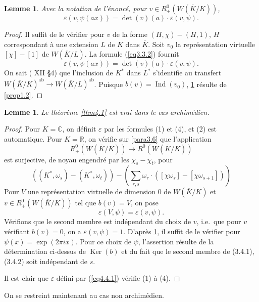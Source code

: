 \documentclass[11pt,a4paper]{amsart}
\theoremstyle{plain}
\newtheorem{lemma}[theorem]{Lemme}
\theoremstyle{definition}
\DeclareMathOperator{\Ind}{Ind}
\DeclareMathOperator{\Ker}{Ker}
\newcommand{\dbR}{\mathbb{R}}
\newcommand{\dbC}{\mathbb{C}}
\newcommand{\ab}{\mathrm{ab}}
\newcommand{\ov}[1]{\overline{#1}}
\newcommand{\eps}{\varepsilon}
\begin{document}
\begin{lemma}\label{lem4.3}
Avec la notation de l'\'enonc\'e, pour $v \in R_{+}^{0}(W(\ov{K}/K))$,
\[
\eps(v,\psi(ax)) = \det(v)(a) \cdot \eps(v,\psi).
\]
\end{lemma}

\begin{proof}
Il suffit de le v\'erifier pour $v$ de la forme $(H,\chi) - (H,1)$, $H$ correspondant \`a une extension $L$ de $K$ dans $\ov{K}$. Soit $v_{0}$ la repr\'esentation virtuelle $[\chi] - [1]$ de $W(\ov{K}/L)$. La formule (\ref{eq3.3.2}) fournit
\[
\eps(v,\psi(ax)) = \det(v)(a) \cdot \eps(v,\psi).
\]
On sait (\cite{10} XII \S4) que l'inclusion de $K^{*}$ dans $L^{*}$ s'identifie au transfert $W(\ov{K}/K)^{\ab} \to W(\ov{K}/L)^{\ab}$. Puisque $b(v) = \Ind(v_{0})$, \ref{lem4.3} r\'esulte de \ref{prop1.2}.
\end{proof}

\begin{lemma}\label{lem4.4}
Le th\'eor\`eme \ref{thm4.1} est vrai dans le cas archim\'edien.
\end{lemma}

\begin{proof}
Pour $K = \dbC$, on d\'efinit $\eps$ par les formules (1) et (4), et (2) est automatique. Pour $K = \dbR$, on v\'erifie sur \ref{para3.6} que l'application
\[
R_{+}^{0}(W(\ov{K}/K)) \longrightarrow R^{0}(W(\ov{K}/K))
\]
est surjective, de noyau engendr\'e par les $\chi_{s} - \chi_{t}$, pour
\[
((K^{*},\omega_{s}) - (K^{*},\omega_{t})) - (\sum_{r,s} \omega_{r} \cdot ([\chi\omega_{s}] - [\chi\omega_{s+1}]))
\]
Pour $V$ une repr\'esentation virtuelle de dimension $0$ de $W(\ov{K}/K)$ et $v \in R_{+}^{0}(W(\ov{K}/K))$ tel que $b(v) = V$, on pose
\begin{equation}\label{eq4.4.1}
\eps(V,\psi) = \eps(v,\psi).
\end{equation}
V\'erifions que le second membre est ind\'ependant du choix de $v$, i.e.~que pour $v$ v\'erifiant $b(v) = 0$, on a $\eps(v,\psi) = 1$. D'apr\`es \ref{lem4.3}, il suffit de le v\'erifier pour $\psi(x) = \exp(2\pi ix)$. Pour ce choix de $\psi$, l'assertion r\'esulte de la d\'etermination ci-dessus de $\Ker(b)$ et du fait que le second membre de (3.4.1), (3.4.2) soit ind\'ependant de $s$.

Il est clair que $\eps$ d\'efini par (\ref{eq4.4.1}) v\'erifie (1) \`a (4).
\end{proof}

On se restreint maintenant au cas non archim\'edien.
\end{document}
